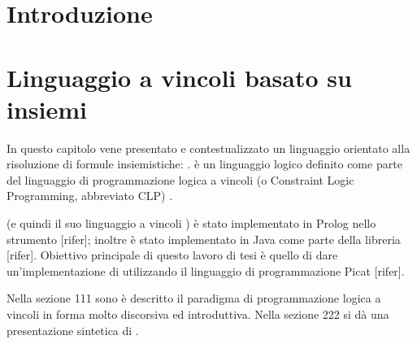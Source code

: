 \documentclass[12pt,a4paper,openright]{book} %
\newenvironment{dedication}
  {%
   \thispagestyle{empty}%
   \vspace*{\stretch{1}}%
   \itshape             %
   \raggedleft          %
  }
  {\par %
   \vspace{\stretch{3}} %
   \clearpage           %
  }
\begin{document}

\tableofcontents



\chapter*{Introduzione}

\lipsum[1-4]


%
%


\chapter{Linguaggio a vincoli basato su insiemi}
\label{ch:sets_based_constraint_language}

\minitoc

In questo capitolo vene presentato e contestualizzato un linguaggio orientato alla risoluzione di formule insiemistiche: \lset{}. \lset{} è un linguaggio logico definito come parte del linguaggio di programmazione logica a vincoli (o Constraint Logic Programming, abbreviato CLP) \clpset{}.

\clpset{} (e quindi il suo linguaggio a vincoli \lset{}) è stato implementato in Prolog nello strumento \setlog{} [rifer]; inoltre \lset{} è stato implementato in Java come parte della libreria \jsetl{} [rifer]. Obiettivo principale di questo lavoro di tesi è quello di dare un’implementazione di \lset{} utilizzando il linguaggio di programmazione Picat [rifer].

Nella sezione 111 sono è descritto il paradigma di programmazione logica a vincoli in forma molto discorsiva ed introduttiva. Nella sezione 222 si dà una presentazione sintetica di \lset{}.
\end{document}
